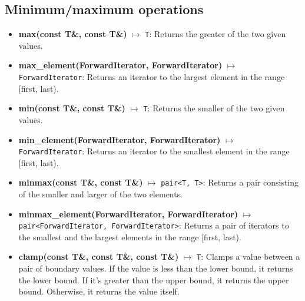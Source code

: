 \documentclass{report}
\begin{document}
    \bigbreak \noindent 
    \subsection{Minimum/maximum operations}
    \begin{itemize}
         \item \textbf{max(const T\&, const T\&)} \(\mapsto\) \texttt{T}: Returns the greater of the two given values.
        \item \textbf{max\_element(ForwardIterator, ForwardIterator)} \(\mapsto\) \texttt{ForwardIterator}: Returns an iterator to the largest element in the range [first, last).
        \item \textbf{min(const T\&, const T\&)} \(\mapsto\) \texttt{T}: Returns the smaller of the two given values.
        \item \textbf{min\_element(ForwardIterator, ForwardIterator)} \(\mapsto\) \texttt{ForwardIterator}: Returns an iterator to the smallest element in the range [first, last).
        \item \textbf{minmax(const T\&, const T\&)} \(\mapsto\) \texttt{pair<T, T>}: Returns a pair consisting of the smaller and larger of the two elements.
        \item \textbf{minmax\_element(ForwardIterator, ForwardIterator)} \(\mapsto\) \texttt{pair<ForwardIterator, ForwardIterator>}: Returns a pair of iterators to the smallest and the largest elements in the range [first, last).
        \item \textbf{clamp(const T\&, const T\&, const T\&)} \(\mapsto\) \texttt{T}: Clamps a value between a pair of boundary values.  If the value is less than the lower bound, it returns the lower bound. If it's greater than the upper bound, it returns the upper bound. Otherwise, it returns the value itself.
    \end{itemize}

    \bigbreak \noindent 
\end{document}
